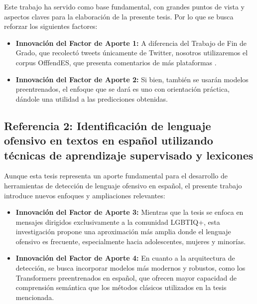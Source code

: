Este trabajo ha servido como base fundamental, con grandes puntos de vista y aspectos claves para la elaboración de la presente tesis. Por lo que se busca reforzar los siguientes factores:

\begin{itemize}
    \item \textbf{Innovación del Factor de Aporte 1:} A diferencia del Trabajo de Fin de Grado, que recolectó tweets únicamente de Twitter, nosotros utilizaremos el corpus OfffendES, que presenta comentarios de más plataformas \cite{plazadelarco2021offendes}.
    \item \textbf{Innovación del Factor de Aporte 2:} Si bien, también se usarán modelos preentrenados, el enfoque que se dará es uno con orientación práctica, dándole una utilidad a las predicciones obtenidas.
\end{itemize}

\subsection{Referencia 2: Identificación de lenguaje ofensivo en textos en español utilizando técnicas de aprendizaje supervisado y lexicones}

Aunque esta tesis representa un aporte fundamental para el desarrollo de herramientas de detección de lenguaje ofensivo en español, el presente trabajo introduce nuevos enfoques y ampliaciones relevantes:

\begin{itemize}
    \item \textbf{Innovación del Factor de Aporte 3:} Mientras que la tesis se enfoca en mensajes dirigidos exclusivamente a la comunidad LGBTIQ+, esta investigación propone una aproximación más amplia donde el lenguaje ofensivo es frecuente, especialmente hacia adolescentes, mujeres y minorías.
    \item \textbf{Innovación del Factor de Aporte 4:} En cuanto a la arquitectura de detección, se busca incorporar modelos más modernos y robustos, como los Transformers preentrenados en español, que ofrecen mayor capacidad de comprensión semántica que los métodos clásicos utilizados en la tesis mencionada.
\end{itemize}













